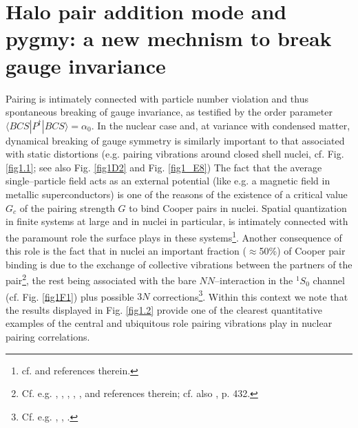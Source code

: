 \section[Halo pair addition mode and pygmy]{Halo pair addition mode and pygmy: a new mechnism to break gauge invariance}\label{App1AF}
Pairing is intimately connected with particle number violation and thus spontaneous breaking of gauge invariance, as testified by the order parameter\\ \mbox{$\langle BCS|P^{\dagger}|BCS\rangle=\alpha_0$}.  In the nuclear case and, at variance with condensed matter, dynamical breaking of gauge symmetry is similarly important to that associated with static distortions (e.g. pairing vibrations around closed shell nuclei, cf. Fig. \ref{fig1.1}; see also Fig. \ref{fig1D2} and Fig. \ref{fig1_E8}) The fact that the average single--particle field acts as an external potential (like e.g. a magnetic field in metallic superconductors) is one of the reasons of the existence of a critical value $G_c$ of the pairing strength $G$ to bind Cooper pairs in nuclei. Spatial quantization in finite systems at large and in nuclei in particular, is intimately connected with the paramount role the surface plays in these systems\footnote{cf. \cite{Broglia:02d} and references therein.}. Another consequence of this role is  the fact that in nuclei an important fraction ($\approx$50\%) of Cooper pair binding is due to the exchange of collective vibrations between the partners of the pair\footnote{ Cf. e.g. \cite{Barranco:99}, \cite{Brink:05}, \cite{Saperstein:12}, \cite{Avdenkov:12}, \cite{Lombardo:12}, and references therein; cf. also \cite{Bohr:75}, p. 432.}, the rest being associated with the bare $NN$--interaction in the $^1S_0$ channel (cf. Fig. \ref{fig1F1}) plus possible $3N$ corrections\footnote{Cf. e.g. \cite{Lesinski:12}, \cite{Pankratov:11}, \cite{Hergert:09}.}. Within this context we note that the results displayed in Fig. \ref{fig1.2} provide one of the clearest quantitative examples of the central and ubiquitous role pairing vibrations play in nuclear pairing correlations.


